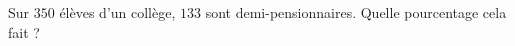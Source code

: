 
\begin{exercice}\label{exo2smath-0012}

    Sur \( 350\) élèves d'un collège, \( 133\) sont demi-pensionnaires. Quelle pourcentage cela fait ?

\end{exercice}
